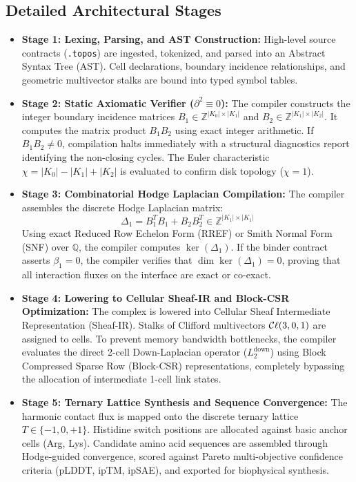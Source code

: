 \subsection{Detailed Architectural Stages}
\begin{itemize}[leftmargin=1.2cm]
    \item \textbf{Stage 1: Lexing, Parsing, and AST Construction:}  
    High-level source contracts (\texttt{.topos}) are ingested, tokenized, and parsed into an Abstract Syntax Tree (AST). Cell declarations, boundary incidence relationships, and geometric multivector stalks are bound into typed symbol tables.
    
    \item \textbf{Stage 2: Static Axiomatic Verifier ($\partial^2 \equiv 0$):}  
    The compiler constructs the integer boundary incidence matrices $B_1 \in \mathbb{Z}^{|K_0| \times |K_1|}$ and $B_2 \in \mathbb{Z}^{|K_1| \times |K_2|}$. It computes the matrix product $B_1 B_2$ using exact integer arithmetic. If $B_1 B_2 \ne 0$, compilation halts immediately with a structural diagnostics report identifying the non-closing cycles. The Euler characteristic $\chi = |K_0| - |K_1| + |K_2|$ is evaluated to confirm disk topology ($\chi = 1$).
    
    \item \textbf{Stage 3: Combinatorial Hodge Laplacian Compilation:}  
    The compiler assembles the discrete Hodge Laplacian matrix:
    \begin{equation}
        \Delta_1 = B_1^T B_1 + B_2 B_2^T \in \mathbb{Z}^{|K_1| \times |K_1|}
    \end{equation}
    Using exact Reduced Row Echelon Form (RREF) or Smith Normal Form (SNF) over $\mathbb{Q}$, the compiler computes $\ker(\Delta_1)$. If the binder contract asserts $\beta_1 = 0$, the compiler verifies that $\dim \ker(\Delta_1) = 0$, proving that all interaction fluxes on the interface are exact or co-exact.
    
    \item \textbf{Stage 4: Lowering to Cellular Sheaf-IR and Block-CSR Optimization:}  
    The complex is lowered into Cellular Sheaf Intermediate Representation (Sheaf-IR). Stalks of Clifford multivectors $\mathcal{C}\ell(3,0,1)$ are assigned to cells. To prevent memory bandwidth bottlenecks, the compiler evaluates the direct 2-cell Down-Laplacian operator ($L_2^{\text{down}}$) using Block Compressed Sparse Row (Block-CSR) representations, completely bypassing the allocation of intermediate 1-cell link states.
    
    \item \textbf{Stage 5: Ternary Lattice Synthesis and Sequence Convergence:}  
    The harmonic contact flux is mapped onto the discrete ternary lattice $T \in \{-1, 0, +1\}$. Histidine switch positions are allocated against basic anchor cells (Arg, Lys). Candidate amino acid sequences are assembled through Hodge-guided convergence, scored against Pareto multi-objective confidence criteria (pLDDT, ipTM, ipSAE), and exported for biophysical synthesis.
\end{itemize}

